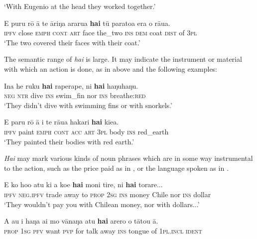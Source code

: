 \glt 
‘With Eugenio at the head they worked together.’ \textstyleExampleref{[R231.307]} 
\z

\ea\label{ex:4.299}
\gll E puru rō {\ꞌ}ā te {\ꞌ}āriŋa ararua \textbf{hai} tū paratoa era o rāua. \\
\textsc{ipfv} close \textsc{emph} \textsc{cont} \textsc{art} face the\_two \textsc{ins} \textsc{dem} coat \textsc{dist} of \textsc{3pl} \\

\glt 
‘The two covered their faces with their coat.’ \textstyleExampleref{[R215.038]} 
\z

The semantic range of \textit{hai} is large. It may indicate the instrument or material with which an action is done, as in  above and the following examples:

\ea\label{ex:4.300}
\gll {\ꞌ}Ina he ruku \textbf{hai} raperape, ni \textbf{hai} haŋuhaŋu.\\
\textsc{neg} \textsc{ntr} dive \textsc{ins} swim\_fin nor \textsc{ins} breathe:\textsc{red}\\

\glt 
‘They didn’t dive with swimming fins or with snorkels.’ \textstyleExampleref{[R360.004]} 
\z

\ea\label{ex:4.301}
\gll E paru rō {\ꞌ}ā i te rāua hakari \textbf{hai} kī{\ꞌ}ea. \\
\textsc{ipfv} paint \textsc{emph} \textsc{cont} \textsc{acc} \textsc{art} \textsc{3pl} body \textsc{ins} red\_earth \\

\glt
‘They painted their bodies with red earth.’ \textstyleExampleref{[R231.095]} 
\z

\textit{Hai} may mark various kinds of noun phrases which are in some way instrumental to the action, such as the price paid as in , or the language spoken as in . 

\ea\label{ex:4.302}
\gll E ko ho{\ꞌ}o atu ki a koe \textbf{hai} moni tire, ni \textbf{hai} torare... \\
\textsc{ipfv} \textsc{neg.ipfv} trade away to \textsc{prop} \textsc{2sg} \textsc{ins} money Chile nor \textsc{ins} dollar \\

\glt 
‘They wouldn’t pay you with Chilean money, nor with dollars...’ \textstyleExampleref{[R239.077]} 
\z

\ea\label{ex:4.303}
\gll A au i haŋa ai mo vānaŋa atu \textbf{hai} {\ꞌ}arero o tātou {\ꞌ}ā. \\
\textsc{prop} \textsc{1sg} \textsc{pfv} want \textsc{pvp} for talk away \textsc{ins} tongue of \textsc{1pl.incl} \textsc{ident} \\

